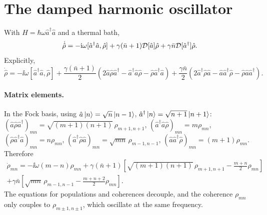 \section{The damped harmonic oscillator}
With $H=\hbar\omega\hat a^\dagger\hat a$ and a thermal bath,
\begin{equation}\label{eq:dampedHO}
  \dot{\hat\rho}=-\mathrm i\omega[\hat a^\dagger\hat a,\hat\rho]+\gamma(\bar n+1)\mathcal D[\hat a]\hat\rho+\gamma\bar n\mathcal D[\hat a^\dagger]\hat\rho .
\end{equation}
Explicitly,
\begin{equation}
  \dot{\hat\rho}=-\ii\omega[\hat a^\dagger\hat a,\hat\rho]+\frac{\gamma(\bar n+1)}2\left(2\hat a\hat\rho\hat a^\dagger-\hat a^\dagger\hat a\hat\rho-\hat\rho\hat a^\dagger\hat a\right)
  +\frac{\gamma\bar n}2\left(2\hat a^\dagger\hat\rho\hat a-\hat a\hat a^\dagger\hat\rho-\hat\rho\hat a\hat a^\dagger\right).
\end{equation}

\paragraph{Matrix elements.} In the Fock basis, using $\hat a\left|n\right\rangle=\sqrt n\left|n-1\right\rangle$, $\hat a^\dagger\left|n\right\rangle=\sqrt{n+1}\left|n+1\right\rangle$:
$(\hat a\hat\rho\hat a^\dagger)_{mn}=\sqrt{(m+1)(n+1)}\,\rho_{m+1,n+1}$, $(\hat a^\dagger\hat a\hat\rho)_{mn}=m\rho_{mn}$, $(\hat\rho\hat a^\dagger\hat a)_{mn}=n\rho_{mn}$,
$(\hat a^\dagger\hat\rho\hat a)_{mn}=\sqrt{mn}\,\rho_{m-1,n-1}$, $(\hat a\hat a^\dagger\hat\rho)_{mn}=(m+1)\rho_{mn}$. Therefore
\begin{multline}
  \dot\rho_{mn}=-\ii\omega(m-n)\rho_{mn}+\gamma(\bar n+1)\left[\sqrt{(m+1)(n+1)}\,\rho_{m+1,n+1}-\frac{m+n}2\rho_{mn}\right]\\
  +\gamma\bar n\left[\sqrt{mn}\,\rho_{m-1,n-1}-\frac{m+n+2}2\rho_{mn}\right].
\end{multline}
The equations for populations and coherences decouple, and the coherence $\rho_{mn}$ only couples to $\rho_{m\pm1,n\pm1}$, which oscillate at the same frequency.


